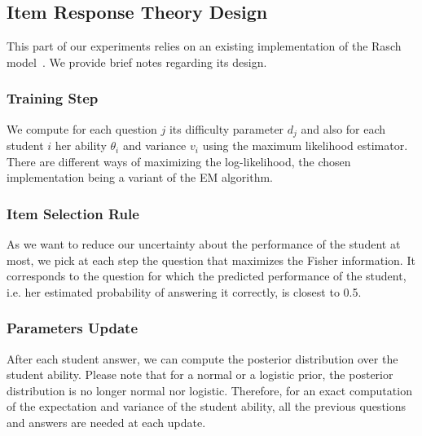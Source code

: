 \documentclass{edm_template}
\begin{document}

\subsection{Item Response Theory Design}

This part of our experiments relies on an existing implementation of the Rasch model~\cite{Rizopoulos2006}. We provide brief notes regarding its design.

\subsubsection{Training Step}

We compute for each question $j$ its difficulty parameter $d_j$ and also for each student $i$ her ability $\theta_i$ and variance $v_i$ using the maximum likelihood estimator. There are different ways of maximizing the log-likelihood, the chosen implementation being a variant of the EM algorithm. %

\subsubsection{Item Selection Rule}

As we want to reduce our uncertainty about the performance of the student at most, we pick at each step the question that maximizes the Fisher information. It corresponds to the question for which the predicted performance of the student, i.e. her estimated probability of answering it correctly, is closest to 0.5. %

\subsubsection{Parameters Update}

After each student answer, we can compute the posterior distribution over the student ability. Please note that for a normal or a logistic prior, the posterior distribution is no longer normal nor logistic. Therefore, for an exact computation of the expectation and variance of the student ability, all the previous questions and answers are needed at each update.
\end{document}
